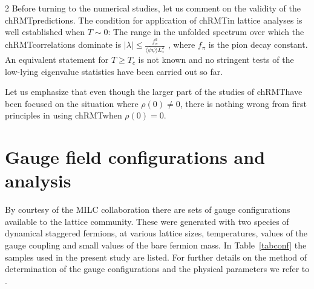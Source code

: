 \begin{multicols}{2}
Before turning to the numerical studies, let us comment on the validity of the 
chRMT\space predictions. The condition for application of  chRMT\space in
lattice  analyses is well established when $T\sim 0$: The range in the unfolded
spectrum over which the chRMT\space correlations dominate is $|\lambda|\le
\frac{f^2_\pi}{\langle\bar{\psi}\psi\rangle L_x^2}$  \cite{JaNoPa98,OsVe98a},
where $f_\pi$ is the pion decay constant. An equivalent statement for $T\geq
T_c$ is not known and no stringent tests of the low-lying eigenvalue statistics
have been carried out so far. 

Let us emphasize that even though the larger part of the studies of 
chRMT\space have been focused on the situation where  $\rho(0)\not=0$, there
is nothing wrong from first principles in using chRMT\space when $\rho(0)=0$.

\section{Gauge field configurations and analysis}

By courtesy of the MILC collaboration \cite{MILC96} there are  sets of gauge
configurations \cite{MILCNERSC} available to  the lattice community. These were
generated with two species of dynamical staggered fermions, at various lattice
sizes, temperatures, values of the gauge coupling and small values of the bare
fermion mass. In Table~\ref{tabconf} the samples used in the present study are
listed. For further details on the method of determination of the gauge
configurations and the physical parameters we refer to \cite{MILC96}.


\end{multicols}
